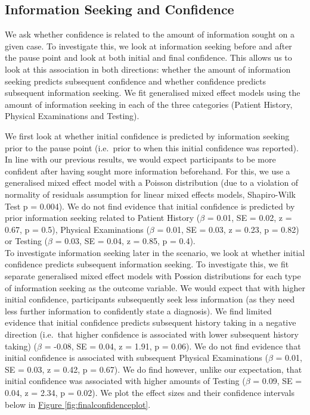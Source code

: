 \documentclass[a4paper, nobind]{templates/ociamthesis}
\begin{document}
\subsection{Information Seeking and Confidence}\label{information-seeking-and-confidence}

We ask whether confidence is related to the amount of information sought on a given case. To investigate this, we look at information seeking before and after the pause point and look at both initial and final confidence. This allows us to look at this association in both directions: whether the amount of information seeking predicts subsequent confidence and whether confidence predicts subsequent information seeking. We fit generalised mixed effect models using the amount of information seeking in each of the three categories (Patient History, Physical Examinations and Testing).

\hfill\break
We first look at whether initial confidence is predicted by information seeking prior to the pause point (i.e.~prior to when this initial confidence was reported). In line with our previous results, we would expect participants to be more confident after having sought more information beforehand. For this, we use a generalised mixed effect model with a Poisson distribution (due to a violation of normality of residuals assumption for linear mixed effects models, Shapiro-Wilk Test p = 0.004). We do not find evidence that initial confidence is predicted by prior information seeking related to Patient History (\(\beta\) = 0.01, SE = 0.02, z = 0.67, p = 0.5), Physical Examinations (\(\beta\) = 0.01, SE = 0.03, z = 0.23, p = 0.82) or Testing (\(\beta\) = 0.03, SE = 0.04, z = 0.85, p = 0.4).\\

To investigate information seeking later in the scenario, we look at whether initial confidence predicts subsequent information seeking. To investigate this, we fit separate generalised mixed effect models with Possion distributions for each type of information seeking as the outcome variable. We would expect that with higher initial confidence, participants subsequently seek less information (as they need less further information to confidently state a diagnosis). We find limited evidence that initial confidence predicts subsequent history taking in a negative direction (i.e.~that higher confidence is associated with lower subsequent history taking) (\(\beta\) = -0.08, SE = 0.04, z = 1.91, p = 0.06). We do not find evidence that initial confidence is associated with subsequent Physical Examinations (\(\beta\) = 0.01, SE = 0.03, z = 0.42, p = 0.67). We do find however, unlike our expectation, that initial confidence was associated with higher amounts of Testing (\(\beta\) = 0.09, SE = 0.04, z = 2.34, p = 0.02). We plot the effect sizes and their confidence intervals below in \hyperref[fig:finalconfidenceplot]{Figure \ref{fig:finalconfidenceplot}}.
\end{document}
